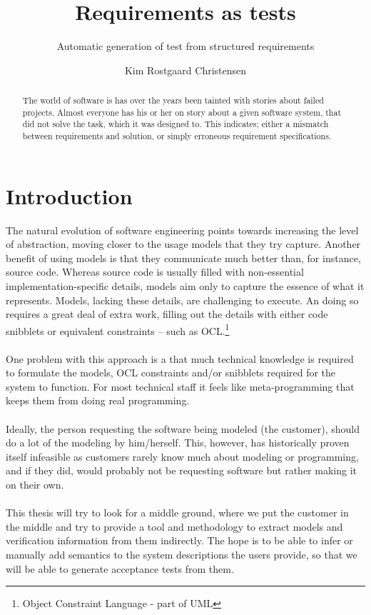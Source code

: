 \documentclass[10pt]{scrreprt}
\author{Kim Rostgaard Christensen}
\title{Requirements as tests}
\subtitle{Automatic generation of test from structured requirements}
\begin{document}
\maketitle

\begin{abstract}
The world of software is has over the years been tainted with stories about failed projects. Almost everyone has his or her on story about a given software system, that did not solve the task, which it was designed to. This indicates; either a mismatch between requirements and solution, or simply erroneous requirement specifications.
\end{abstract}

\chapter{Introduction}
The natural evolution of software engineering points towards increasing the level of abstraction, moving closer to the usage models that they try capture. Another benefit of using models is that they communicate much better than, for instance, source code. Whereas source code is usually filled with non-essential implementation-specific details, models aim only to capture the essence of what it represents. Models, lacking these details, are challenging to execute. An doing so requires a great deal of extra work, filling out the details with either code snibblets or equivalent constraints -- such as OCL.\footnote{Object Constraint Language - part of UML}\\\\
One problem with this approach is a that much technical knowledge is required to formulate the models, OCL constraints and/or snibblets required for the system to function. For most technical staff it feels like meta-programming that keeps them from doing real programming.
\\\\
Ideally, the person requesting the software being modeled (the customer), should do a lot of the modeling by him/herself. This, however, has historically proven itself infeasible as customers rarely know much about modeling or programming, and if they did, would probably not be requesting software but rather making it on their own.
\\\\
This thesis will try to look for a middle ground, where we put the customer in the middle and try to provide a tool and methodology to extract models and verification information from them indirectly. The hope is to be able to infer or manually add semantics to the system descriptions the users provide, so that we will be able to generate acceptance tests from them.
\end{document}
